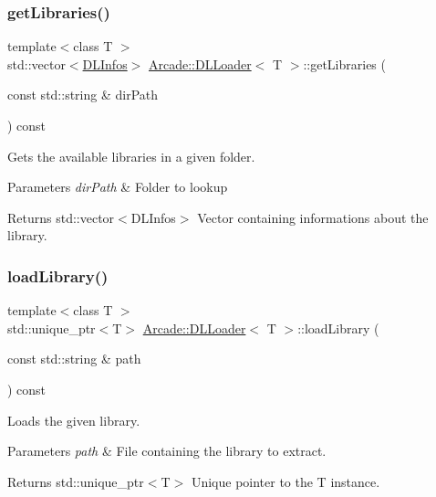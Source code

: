 \subsubsection{\texorpdfstring{getLibraries()}{getLibraries()}}
{\footnotesize\ttfamily template$<$class T $>$ \\
std\+::vector$<$\mbox{\hyperlink{structArcade_1_1DLInfos}{D\+L\+Infos}}$>$ \mbox{\hyperlink{classArcade_1_1DLLoader}{Arcade\+::\+D\+L\+Loader}}$<$ T $>$\+::get\+Libraries (\begin{DoxyParamCaption}\item[{const std\+::string \&}]{dir\+Path }\end{DoxyParamCaption}) const}



Gets the available libraries in a given folder. 


\begin{DoxyParams}{Parameters}
{\em dir\+Path} & Folder to lookup \\
\hline
\end{DoxyParams}
\begin{DoxyReturn}{Returns}
std\+::vector$<$\+D\+L\+Infos$>$ Vector containing informations about the library. 
\end{DoxyReturn}
\mbox{\label{classArcade_1_1DLLoader_ad9fb1241a01190637402f3866c695272}} 
\subsubsection{\texorpdfstring{loadLibrary()}{loadLibrary()}}
{\footnotesize\ttfamily template$<$class T $>$ \\
std\+::unique\+\_\+ptr$<$T$>$ \mbox{\hyperlink{classArcade_1_1DLLoader}{Arcade\+::\+D\+L\+Loader}}$<$ T $>$\+::load\+Library (\begin{DoxyParamCaption}\item[{const std\+::string \&}]{path }\end{DoxyParamCaption}) const}



Loads the given library. 


\begin{DoxyParams}{Parameters}
{\em path} & File containing the library to extract. \\
\hline
\end{DoxyParams}
\begin{DoxyReturn}{Returns}
std\+::unique\+\_\+ptr$<$\+T$>$ Unique pointer to the T instance. 
\end{DoxyReturn}

